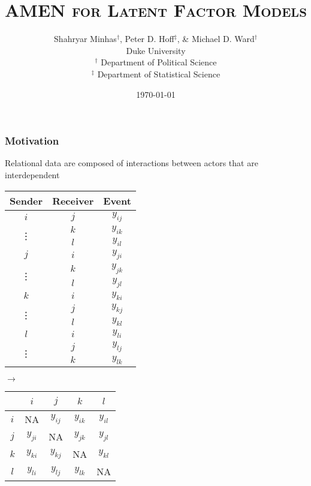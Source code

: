 \documentclass[10pt, compress]{beamer}
\title[AMEN]{\textsc{AMEN for Latent Factor Models}}
\author[Minhas, Hoff, \& Ward]{Shahryar Minhas$^\dag$, Peter D. Hoff$^\ddag$, \& Michael D. Ward$^\dag$ \\ Duke University \\ $^\dag$ Department of Political Science \\ $^\ddag$ Department of Statistical Science}
\date{\today}
\begin{document}
\frame{\titlepage}

\frame
{
  \frametitle{Motivation}
  
  Relational data are composed of interactions between actors that are interdependent 

\small{
\begin{table}[ht]
  \captionsetup{justification=raggedright }
  \centering
  \begin{minipage}{.45\textwidth}
    \centering
    \begingroup
    \setlength{\tabcolsep}{10pt}
    \begin{tabular}{ccc}
      Sender & Receiver & Event \\
      \hline\hline
      $i$ & $j$ & $y_{ij}$ \\
      \multirow{2}{*}{\vdots} & $k$ & $y_{ik}$ \\
      ~ & $l$ & $y_{il}$ \\
      $j$ & $i$ & $y_{ji}$ \\
      \multirow{2}{*}{\vdots} & $k$ & $y_{jk}$ \\
      ~ & $l$ & $y_{jl}$ \\
      $k$ & $i$ & $y_{ki}$ \\
      \multirow{2}{*}{\vdots} & $j$ & $y_{kj}$ \\
      ~ & $l$ & $y_{kl}$ \\
      $l$ & $i$ & $y_{li}$ \\
      \multirow{2}{*}{\vdots} & $j$ & $y_{lj}$ \\
      ~ & $k$ & $y_{lk}$ \\
      \hline\hline
    \end{tabular}
    \endgroup
  \end{minipage}
  $\mathbf{\longrightarrow}$
  \begin{minipage}{.45\textwidth}
    \centering
    \begingroup
    \setlength{\tabcolsep}{10pt}
    \renewcommand{\arraystretch}{1.5}
    \begin{tabular}{c||cccc}
    ~ & $i$ & $j$ & $k$ & $l$ \\ \hline\hline
    $i$ & \footnotesize{NA} & $y_{ij}$ & $y_{ik}$ & $y_{il}$ \\
    $j$ & $y_{ji}$ & \footnotesize{NA}  & $y_{jk}$ & $y_{jl}$ \\
    $k$ & $y_{ki}$ & $y_{kj}$ & \footnotesize{NA}  & $y_{kl}$ \\
    $l$ & $y_{li}$ & $y_{lj}$ & $y_{lk}$ & \footnotesize{NA}  \\
    \end{tabular}
    \endgroup
  \end{minipage}
\end{table}
}

} 
\end{document}
